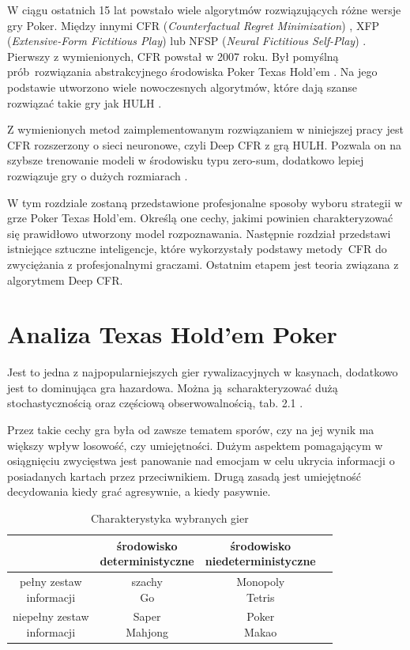 \documentclass[12pt,oneside,a4paper]{report}
\begin{document}
W ciągu ostatnich 15 lat powstało wiele algorytmów rozwiązujących różne wersje gry Poker.
Między innymi CFR (\emph{Counterfactual Regret Minimization}) \cite{CFR}, XFP (\emph{Extensive-Form
Fictitious Play}) \cite{XFP} lub
NFSP (\emph{Neural Fictitious Self-Play}) \cite{NFSP}.
Pierwszy z wymienionych, CFR powstał w 2007 roku. Był 
pomyślną prób rozwiązania abstrakcyjnego środowiska Poker Texas Hold'em \cite{CFR}. 
Na jego podstawie utworzono wiele nowoczesnych
algorytmów, które dają szanse rozwiązać takie gry jak HULH \cite{CFR}.


Z wymienionych metod zaimplementowanym rozwiązaniem w niniejszej pracy jest CFR 
rozszerzony o sieci neuronowe,
czyli Deep CFR z grą HULH. Pozwala on na szybsze trenowanie modeli w środowisku typu zero-sum,
dodatkowo lepiej rozwiązuje gry o dużych rozmiarach \cite{DCFR}.

W tym rozdziale zostaną przedstawione profesjonalne sposoby wyboru strategii w grze Poker Texas Hold'em. 
Określą one cechy, jakimi powinien charakteryzować się prawidłowo utworzony model rozpoznawania.
Następnie rozdział przedstawi istniejące sztuczne inteligencje, które wykorzystały podstawy
metody CFR do
zwyciężania z profesjonalnymi graczami.
Ostatnim etapem jest teoria związana z algorytmem Deep CFR.

\section{Analiza Texas Hold'em Poker}

Jest to jedna z najpopularniejszych gier rywalizacyjnych w kasynach, dodatkowo jest to
dominująca gra hazardowa. Można ją scharakteryzować dużą stochastycznością oraz częściową 
obserwowalnością, tab. 2.1 \cite{poker}.  


Przez takie cechy gra była od zawsze tematem sporów, czy na jej wynik ma większy wpływ
losowość, czy umiejętności. Dużym aspektem pomagającym w osiągnięciu zwycięstwa
jest panowanie nad emocjam w celu ukrycia informacji o posiadanych kartach przez przeciwnikiem.
Drugą zasadą jest umiejętność decydowania kiedy grać agresywnie, a kiedy pasywnie.

\newpage
\begin{table}[h!]
\centering
\caption{Charakterystyka wybranych gier}
\begin{tabular}{|c|c|c|c| }
   \hline
    & \makecell{środowisko \\ deterministyczne} & \makecell{środowisko \\ niedeterministyczne} \\
    \hline
   \makecell{pełny zestaw \\ informacji} &  \makecell{szachy \\ Go } & \makecell{Monopoly \\ Tetris }\\ 
   \hline
   \makecell{niepełny zestaw \\ informacji} &  \makecell{Saper \\ Mahjong } & \makecell{Poker \\
   Makao}  \\  
   \hline
\end{tabular}
\end{table}
\end{document}
